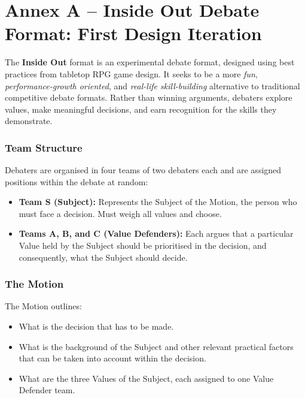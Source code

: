 \documentclass[12pt]{article}
\begin{document}

\newpage
\section*{Annex A -- Inside Out Debate Format: First Design Iteration}

The \textbf{Inside Out} format is an experimental debate format, designed using best practices from tabletop RPG game design. It seeks to be a more \textit{fun}, \textit{performance-growth oriented}, and \textit{real-life skill-building} alternative to traditional competitive debate formats. Rather than winning arguments, debaters explore values, make meaningful decisions, and earn recognition for the skills they demonstrate.

\subsubsection{Team Structure}

Debaters are organised in four teams of two debaters each and are assigned positions within the debate at random:

\begin{itemize}
    \item \textbf{Team S (Subject):} Represents the Subject of the Motion, the person who must face a decision. Must weigh all values and choose.
    \item \textbf{Teams A, B, and C (Value Defenders):} Each argues that a particular Value held by the Subject should be prioritised in the decision, and consequently, what the Subject should decide.
\end{itemize}

\subsubsection{The Motion}

The Motion outlines:

\begin{itemize}
    \item What is the decision that has to be made.
    \item What is the background of the Subject and other relevant practical factors that can be taken into account within the decision.
    \item What are the three Values of the Subject, each assigned to one Value Defender team.
\end{itemize}
\end{document}
